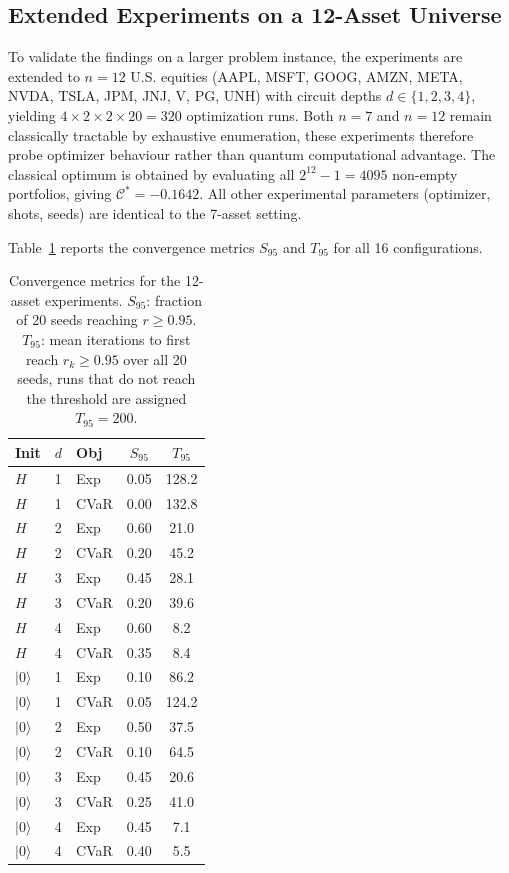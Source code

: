 \documentclass[runningheads]{llncs}
\begin{document}
\subsection{Extended Experiments on a 12-Asset Universe}
\label{sec:extended}

To validate the findings on a larger problem instance, the experiments are extended to $n = 12$ U.S. equities (AAPL, MSFT, GOOG, AMZN, META, NVDA, TSLA, JPM, JNJ, V, PG, UNH) with circuit depths $d \in \{1, 2, 3, 4\}$, yielding $4 \times 2 \times 2 \times 20 = 320$ optimization runs. Both $n = 7$ and $n = 12$ remain classically tractable by exhaustive enumeration, these experiments therefore probe optimizer behaviour rather than quantum computational advantage. The classical optimum is obtained by evaluating all $2^{12} - 1 = 4095$ non-empty portfolios, giving $\mathcal{C}^* = -0.1642$. All other experimental parameters (optimizer, shots, seeds) are identical to the 7-asset setting.

Table~\ref{tab:s95_t95} reports the convergence metrics $S_{95}$ and $T_{95}$ for all 16 configurations.

\begin{table}[t]
\caption{Convergence metrics for the 12-asset experiments. $S_{95}$: fraction of 20 seeds reaching $r \geq 0.95$. $T_{95}$: mean iterations to first reach $r_k \geq 0.95$ over all 20 seeds, runs that do not reach the threshold are assigned $T_{95}=200$.}
\label{tab:s95_t95}
\centering
\begin{tabular}{lllcc}
\hline
\textbf{Init} & \textbf{$d$} & \textbf{Obj} & \textbf{$S_{95}$} & \textbf{$T_{95}$} \\
\hline
$H$         & 1 & Exp  & 0.05 & 128.2 \\
$H$         & 1 & CVaR & 0.00 & 132.8 \\
$H$         & 2 & Exp  & 0.60 & 21.0  \\
$H$         & 2 & CVaR & 0.20 & 45.2  \\
$H$         & 3 & Exp  & 0.45 & 28.1  \\
$H$         & 3 & CVaR & 0.20 & 39.6  \\
$H$         & 4 & Exp  & 0.60 & 8.2   \\
$H$         & 4 & CVaR & 0.35 & 8.4   \\
\hline
$|0\rangle$ & 1 & Exp  & 0.10 & 86.2  \\
$|0\rangle$ & 1 & CVaR & 0.05 & 124.2 \\
$|0\rangle$ & 2 & Exp  & 0.50 & 37.5  \\
$|0\rangle$ & 2 & CVaR & 0.10 & 64.5  \\
$|0\rangle$ & 3 & Exp  & 0.45 & 20.6  \\
$|0\rangle$ & 3 & CVaR & 0.25 & 41.0  \\
$|0\rangle$ & 4 & Exp  & 0.45 & 7.1   \\
$|0\rangle$ & 4 & CVaR & 0.40 & 5.5   \\
\hline
\end{tabular}
\end{table}
\end{document}
